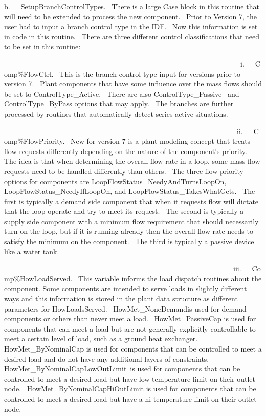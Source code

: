 b.~~~SetupBranchControlTypes.~ There is a large Case block in this routine that will need to be extended to process the new component.~ Prior to Version 7, the user had to input a branch control type in the IDF.~ Now this information is set in code in this routine.~ There are three different control classifications that need to be set in this routine:

~~~~~~~~~~~~~~~~~~~~~~~~~~~~~~~~~~~~~~~~~~~~~~~~~~~~~~~~~~~~~~~~~~i.~~~Comp\%FlowCtrl.~ This is the branch control type input for versions prior to version 7.~ Plant components that have some influence over the mass flows should be set to ControlType\_Active.~ There are also ControlType\_Passive~ and ControlType\_ByPass options that may apply.~ The branches are further processed by routines that automatically detect series active situations.

~~~~~~~~~~~~~~~~~~~~~~~~~~~~~~~~~~~~~~~~~~~~~~~~~~~~~~~~~~~~~~~~~ii.~~~Comp\%FlowPriority.~ New for version 7 is a plant modeling concept that treats flow requests differently depending on the nature of the component's priority.~ The idea is that when determining the overall flow rate in a loop, some mass flow requests need to be handled differently than others.~ The three flow priority options for components are LoopFlowStatus\_NeedyAndTurnsLoopOn, LoopFlowStatus\_NeedyIfLoopOn, and LoopFlowStatus\_TakesWhatGets.~ The first is typically a demand side component that when it requests flow will dictate that the loop operate and try to meet its request.~ The second is typically a supply side component with a minimum flow requirement that should necessarily turn on the loop, but if it is running already then the overall flow rate needs to satisfy the minimum on the component.~ The third is typically a passive device like a water tank.

~~~~~~~~~~~~~~~~~~~~~~~~~~~~~~~~~~~~~~~~~~~~~~~~~~~~~~~~~~~~~~~~iii.~~~Comp\%HowLoadServed.~ This variable informs the load dispatch routines about the component. Some components are intended to serve loads in slightly different ways and this information is stored in the plant data structure as different parameters for HowLoadsServed.~ HowMet\_NoneDemandis used for demand components or others than never meet a load.~ HowMet\_PassiveCap is used for components that can meet a load but are not generally explicitly controllable to meet a certain level of load, such as a ground heat exchanger.~ HowMet\_ByNominalCap is used for components that can be controlled to meet a desired load and do not have any additional layers of constraints.~ HowMet\_ByNominalCapLowOutLimit~is used for components that can be controlled to meet a desired load but have low temperature limit on their outlet node.~ HowMet\_ByNominalCapHiOutLimit is used for components that can be controlled to meet a desired load but have a hi temperature limit on their outlet node.

